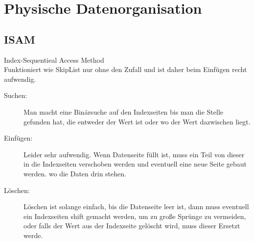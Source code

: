 \chapter{Physische Datenorganisation}

\section{ISAM}
Index-Sequentieal Access Method\\

Funktioniert wie SkipList nur ohne den Zufall und ist daher beim Einfügen recht aufwendig. 
\begin{description}
\item [Suchen:] Man macht eine Binärsuche auf den Indexseiten bis man die Stelle gefunden hat, die entweder der Wert ist oder wo der Wert dazwischen liegt.
\item[Einfügen:] Leider sehr aufwendig. Wenn Datenseite füllt ist, muss ein Teil von dieser in die Indexseiten verschoben werden und eventuell eine neue Seite gebaut werden. wo die Daten drin stehen. 
\item[Löschen:] Löschen ist solange einfach, bis die Datenseite leer ist, dann muss eventuell ein Indexseiten shift gemacht werden, um zu große Sprünge zu vermeiden, oder falls der Wert aus der Indexseite gelöscht wird, muss dieser Ersetzt werde.
\end{description}

